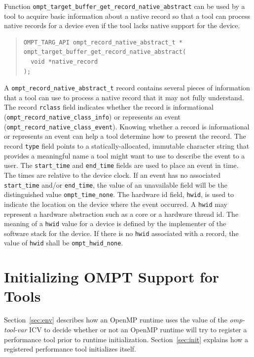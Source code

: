 \documentclass{article}
\begin{document}
Function  \verb|ompt_target_buffer_get_record_native_abstract| can be
used by a tool to acquire basic information about a native record 
so that a tool can process native records for a device even if the
tool lacks native support for the device. 
\begin{quote}
\begin{verbatim}
OMPT_TARG_API ompt_record_native_abstract_t *
ompt_target_buffer_get_record_native_abstract(
  void *native_record 
);

\end{verbatim}
\end{quote}
A  \verb|ompt_record_native_abstract_t| record contains several pieces of information that a tool can use to process a native record that it may not fully understand. The record \verb|rclass| field indicates whether the record is informational (\verb|ompt_record_native_class_info|) or represents an event (\verb|ompt_record_native_class_event|). Knowing whether a record is informational or represents an event can help a tool determine how to present the record. The record  \verb|type| field points to a statically-allocated, immutable character string that provides  a meaningful name  a tool might want to use to describe the event to a user. The \verb|start_time| and \verb|end_time| fields are used to place an event in time. The times are relative to the device clock. If an event has no associated \verb|start_time| and/or \verb|end_time|, the value of an unavailable field will be the distinguished value \verb|ompt_time_none|. The hardware id field, \verb|hwid|,  is used to indicate the location on the device where the event occurred. A \verb|hwid| may represent a hardware abstraction such as a core or a hardware thread id. The meaning of a \verb|hwid| value for a device is defined by the implementer of the software stack for the device. If there is no \verb|hwid| associated with a record, the value of \verb|hwid| shall be \verb|ompt_hwid_none|. 

\section{Initializing OMPT Support for Tools}
\label{sec:enabling}

Section~\ref{sec:env} describes how an OpenMP runtime uses the value of the {\em omp-tool-var} ICV to decide whether or not an OpenMP runtime will try to register a performance tool prior to runtime initialization.
Section~\ref{sec:init} explains how a registered performance tool initializes itself.
\end{document}

